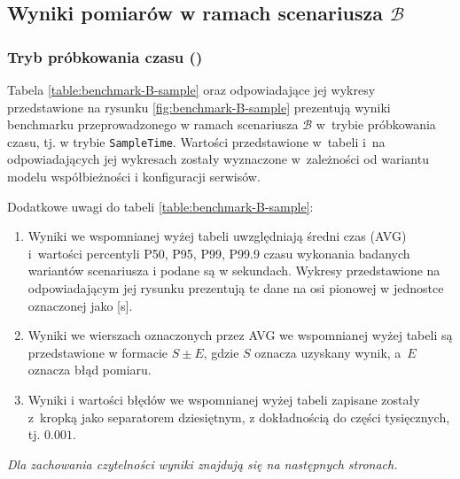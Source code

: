 \FloatBarrier
\subsection{Wyniki pomiarów w ramach scenariusza \ensuremath{\mathcal{B}}}
\label{sec:results-scenario-B}

\subsubsection{Tryb próbkowania czasu ()}
Tabela \ref{table:benchmark-B-sample} oraz odpowiadające jej wykresy przedstawione na rysunku \ref{fig:benchmark-B-sample} prezentują wyniki benchmarku przeprowadzonego w ramach scenariusza $\mathcal{B}$ w~trybie próbkowania czasu, tj. w trybie \texttt{SampleTime}. Wartości przedstawione w~tabeli i~na odpowiadających jej wykresach zostały wyznaczone w~zależności od wariantu modelu współbieżności i konfiguracji serwisów.

\noindent
Dodatkowe uwagi do tabeli \ref{table:benchmark-B-sample}:
\begin{enumerate}[label=(\roman*)]
    \item Wyniki we wspomnianej wyżej tabeli uwzględniają średni czas (AVG) i~wartości percentyli P50, P95, P99, P99.9 czasu wykonania badanych wariantów scenariusza i podane są w sekundach. Wykresy przedstawione na odpowiadającym jej rysunku prezentują te dane na osi pionowej w jednostce oznaczonej jako [s].
    \item Wyniki we wierszach oznaczonych przez AVG we wspomnianej wyżej tabeli są przedstawione w formacie $S \pm E$, gdzie $S$ oznacza uzyskany wynik, a~$E$ oznacza błąd pomiaru.
    \item Wyniki i wartości błędów we wspomnianej wyżej tabeli zapisane zostały z~kropką jako separatorem dziesiętnym, z dokładnością do części tysięcznych, tj. $0.001$.
\end{enumerate}

\vspace{1em}
\textit{Dla zachowania czytelności wyniki znajdują się na następnych stronach.}


